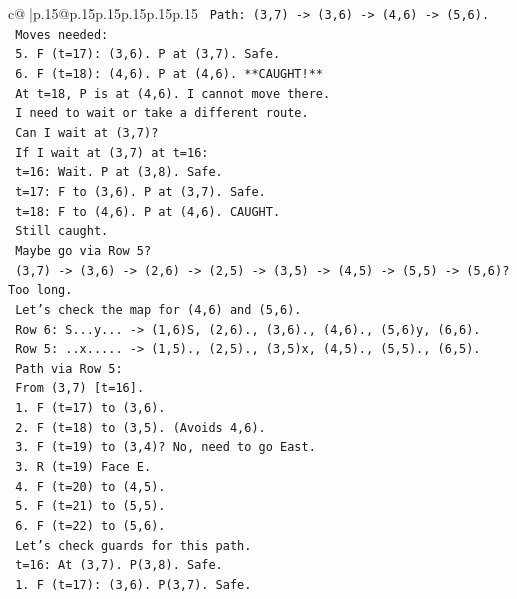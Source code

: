 \documentclass{article}
\begin{document}
{\begin{supertabular}{c@{$\;$}|p{.15\linewidth}@{}p{.15\linewidth}p{.15\linewidth}p{.15\linewidth}p{.15\linewidth}p{.15\linewidth}}
{{{\texttt{   Path: (3,7) {-}> (3,6) {-}> (4,6) {-}> (5,6).} \\
\texttt{   Moves needed:} \\
\texttt{   5. F (t=17): (3,6). P at (3,7). Safe.} \\
\texttt{   6. F (t=18): (4,6). P at (4,6). **CAUGHT!**} \\
\texttt{   At t=18, P is at (4,6). I cannot move there.} \\
\texttt{   I need to wait or take a different route.} \\
\texttt{   Can I wait at (3,7)?} \\
\texttt{   If I wait at (3,7) at t=16:} \\
\texttt{   t=16: Wait. P at (3,8). Safe.} \\
\texttt{   t=17: F to (3,6). P at (3,7). Safe.} \\
\texttt{   t=18: F to (4,6). P at (4,6). CAUGHT.} \\
\texttt{   Still caught.} \\
\texttt{   Maybe go via Row 5?} \\
\texttt{   (3,7) {-}> (3,6) {-}> (2,6) {-}> (2,5) {-}> (3,5) {-}> (4,5) {-}> (5,5) {-}> (5,6)? Too long.} \\
\texttt{   Let's check the map for (4,6) and (5,6).} \\
\texttt{   Row 6: S...y... {-}> (1,6)S, (2,6)., (3,6)., (4,6)., (5,6)y, (6,6).} \\
\texttt{   Row 5: ..x..... {-}> (1,5)., (2,5)., (3,5)x, (4,5)., (5,5)., (6,5).} \\
\texttt{   Path via Row 5:} \\
\texttt{   From (3,7) {[}t=16{]}.} \\
\texttt{   1. F (t=17) to (3,6).} \\
\texttt{   2. F (t=18) to (3,5). (Avoids 4,6).} \\
\texttt{   3. F (t=19) to (3,4)? No, need to go East.} \\
\texttt{   3. R (t=19) Face E.} \\
\texttt{   4. F (t=20) to (4,5).} \\
\texttt{   5. F (t=21) to (5,5).} \\
\texttt{   6. F (t=22) to (5,6).} \\
\texttt{   Let's check guards for this path.} \\
\texttt{   t=16: At (3,7). P(3,8). Safe.} \\
\texttt{   1. F (t=17): (3,6). P(3,7). Safe.} \\
}}}
\end{supertabular}}
\end{document}
